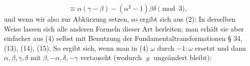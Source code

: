 \[
\equiv \alpha(\gamma-\beta) - (\alpha^2-1)\beta\delta \pmod{3},
\]
und wenn wir also zur Abkürzung
setzen, so ergibt sich aus (2):
In derselben Weise lassen sich alle anderen Formeln dieser Art herleiten; man erhält sie aber einfacher aus (4) selbst mit Benutzung der Fundamentaltransformationen § 34, (13), (14), (15). So ergibt sich, wenn man in (4) $\omega$ durch $-1:\omega$ ersetzt und dann $\alpha, \beta, \gamma, \delta$ mit $\beta, -\alpha, \delta, -\gamma$ vertauscht (wodurch $\varrho$ ungeändert bleibt):
